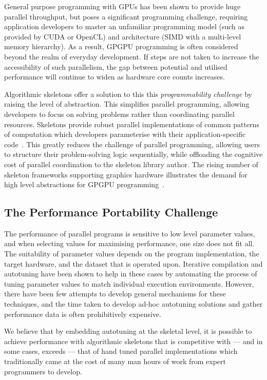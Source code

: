 \documentclass[nonatbib,preprint,9pt]{sigplanconf}
\begin{document}
General purpose programming with GPUs has been shown to provide huge
parallel throughput, but poses a significant programming challenge,
requiring application developers to master an unfamiliar programming
model (such as provided by CUDA or OpenCL) and architecture (SIMD with
a multi-level memory hierarchy). As a result, GPGPU programming is
often considered beyond the realm of everyday development. If steps
are not taken to increase the accessibility of such parallelism, the
gap between potential and utilised performance will continue to widen
as hardware core counts increases.

Algorithmic skeletons offer a solution to this this
\emph{programmability challenge} by raising the level of
abstraction. This simplifies parallel programming, allowing developers
to focus on solving problems rather than coordinating parallel
resources. Skeletons provide robust parallel implementations of common
patterns of computation which developers parameterise with their
application-specific code~\cite{Gonzalez2010}. This greatly reduces
the challenge of parallel programming, allowing users to structure
their problem-solving logic sequentially, while offloading the
cognitive cost of parallel coordination to the skeleton library
author. The rising number of skeleton frameworks supporting graphics
hardware illustrates the demand for high level abstractions for GPGPU
programming~\cite{Enmyren2010, Marques2013, Nugteren2014a}.


\subsection{The Performance Portability Challenge}

The performance of parallel programs is sensitive to low level
parameter values, and when selecting values for maximising
performance, one size does not fit all. The suitability of parameter
values depends on the program implementation, the target hardware, and
the dataset that is operated upon. Iterative compilation and
autotuning have been shown to help in these cases by automating the
process of tuning parameter values to match individual execution
environments. However, there have been few attempts to develop general
mechanisms for these techniques, and the time taken to develop ad-hoc
autotuning solutions and gather performance data is often
prohibitively expensive.

We believe that by embedding autotuning at the skeletal level, it is
possible to achieve performance with algorithmic skeletons that is
competitive with --- and in some cases, exceeds --- that of hand tuned
parallel implementations which traditionally came at the cost of many
man hours of work from expert programmers to develop.
\end{document}
